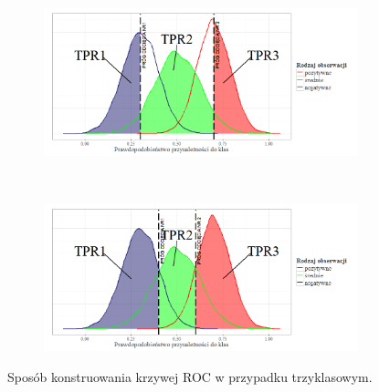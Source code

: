 \documentclass{mini}
\begin{document}
\begin{figure}[h]
	\begin{center}
  \begin{subfigure}[h]{\textwidth}
    \includegraphics[width=\textwidth]{graphics/roc_trzy1.png}
  \end{subfigure}\\
  \begin{subfigure}[h]{\textwidth}
    \includegraphics[width=\textwidth]{graphics/roc_trzy2.png}
  \end{subfigure}
  \end{center}
  \caption{Sposób konstruowania krzywej ROC w przypadku trzyklasowym.}
  \label{trzyklasowy}
\end{figure}
\end{document}
